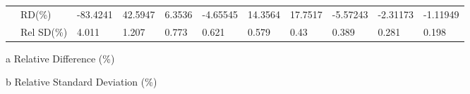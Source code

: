 \documentclass[letterpaper,12pt]{article}
\begin{document}
\begin{table}[H]
\begin{adjustbox}{width=\columnwidth,center}
\begin{threeparttable}
\begin{tabular}{lllllllllll}
                             & RD(\%)\tnote{a}                                         & -83.4241        & 42.5947        & 6.3536        & -4.65545        & 14.3564        & 17.7517        & -5.57243        & -2.31173        & -1.11949        \\ 
                             & Rel SD(\%)\tnote{b}                                          & 4.011        & 1.207        & 0.773        & 0.621        & 0.579        & 0.43        & 0.389        & 0.281        & 0.198        \\ \hline
\end{tabular} 
\begin{tablenotes}\footnotesize
\item[a] Relative Difference (\%)
\item[b] Relative Standard Deviation (\%)
\end{tablenotes}
\end{threeparttable}
\end{adjustbox}
\label{CrossFromLiver}
\end{table}
\end{document}
